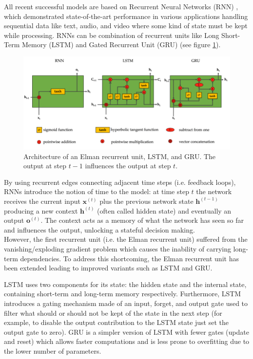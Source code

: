 \documentclass[a4paper]{article} %
\begin{document}
	All recent successful models are based on Recurrent Neural Networks (RNN) \cite{RNN, RNNForecasting}, which demonstrated state-of-the-art performance in various applications handling sequential data like text, audio, and video where some kind of state must be kept while processing. RNNs can be combination of recurrent units like Long Short-Term Memory (LSTM) and Gated Recurrent Unit (GRU) (see figure \ref{fig:lstmgru}). 
	\begin{figure}
		\includegraphics[width=\linewidth]{img/rnns.png}
		\caption{Architecture of an Elman recurrent unit, LSTM, and GRU. The output at step $t-1$ influences the output at step $t$.}
		\label{fig:lstmgru}
	\end{figure}
	By using recurrent edges connecting adjacent time steps (i.e. feedback loops), RNNs introduce the notion of time to the model: at time step $t$ the network receives the current input $\pmb{x}^{(t)}$ plus the previous network state $\pmb{h}^{(t-1)}$ producing a new context $\pmb{h}^{(t)}$ (often called hidden state) and eventually an output $\pmb{o}^{(t)}$.
	The context acts as a memory of what the network has seen so far and influences the output, unlocking a stateful decision making.\\
	However, the first recurrent unit (i.e. the Elman recurrent unit) suffered from the vanishing/exploding gradient problem \cite{VanishingGradient} which causes the inability of carrying long-term dependencies. To address this shortcoming, the Elman recurrent unit has been extended leading to improved variants such as LSTM and GRU.
	
	LSTM uses two components for its state: the hidden state and the internal state, containing short-term and long-term memory respectively. Furthermore, LSTM introduces a gating mechanism made of an input, forget, and output gate used to filter what should or should not be kept of the state in the next step (for example, to disable the output contribution to the LSTM state just set the output gate to zero). GRU is a simpler version of LSTM with fewer gates (update and reset) which allows faster computations and is less prone to overfitting due to the lower number of parameters.
	
\end{document}
